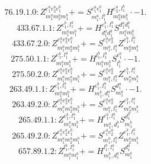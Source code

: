 \documentclass[letterpaper,10pt,fleqn,leqno,onecolumn]{article}
\begin{document}
\begin{equation} \;\;\;\;\;\;  76.19.1.0: Z^{e_{1}^{a}e_{2}^{a}e_{1}^{b}}_{m_{1}^{a}m_{2}^{a}m_{1}^{b}}+=S^{e_{1}^{a}e_{1}^{b}}_{m_{1}^{a},l_{1}^{b}}H^{e_{2}^{a},l_{1}^{b}}_{m_{2}^{a}m_{1}^{b}}\cdot -1. \end{equation}
\begin{equation} \;\;\;\;\;\;  433.67.1.1: Z^{e_{1}^{b},l_{1}^{a}}_{m_{1}^{a}m_{1}^{b}}+=H^{e_{1}^{b},l_{1}^{a}}_{d_{1}^{a}d_{1}^{b}}S^{d_{1}^{a}d_{1}^{b}}_{m_{1}^{a}m_{1}^{b}} \end{equation}
\begin{equation} \;\;\;\;\;\;  433.67.2.0: Z^{e_{1}^{a}e_{2}^{a}e_{1}^{b}}_{m_{1}^{a}m_{2}^{a}m_{1}^{b}}+=S^{e_{1}^{a}e_{2}^{a}}_{m_{1}^{a},l_{1}^{a}}Z^{e_{1}^{b},l_{1}^{a}}_{m_{2}^{a}m_{1}^{b}} \end{equation}
\begin{equation} \;\;\;\;\;\;  275.50.1.1: Z^{e_{1}^{b},l_{1}^{a}}_{m_{1}^{a}m_{1}^{b}}+=H^{l_{1}^{b},l_{1}^{a}}_{m_{1}^{a}m_{1}^{b}}S^{e_{1}^{b}}_{l_{1}^{b}}\cdot -1. \end{equation}
\begin{equation} \;\;\;\;\;\;  275.50.2.0: Z^{e_{1}^{a}e_{2}^{a}e_{1}^{b}}_{m_{1}^{a}m_{2}^{a}m_{1}^{b}}+=S^{e_{1}^{a}e_{2}^{a}}_{m_{1}^{a},l_{1}^{a}}Z^{e_{1}^{b},l_{1}^{a}}_{m_{2}^{a}m_{1}^{b}} \end{equation}
\begin{equation} \;\;\;\;\;\;  263.49.1.1: Z^{e_{1}^{b},l_{1}^{a}}_{m_{1}^{a}m_{1}^{b}}+=H^{e_{1}^{b},l_{1}^{a}}_{m_{1}^{b},d_{1}^{a}}S^{d_{1}^{a}}_{m_{1}^{a}}\cdot -1. \end{equation}
\begin{equation} \;\;\;\;\;\;  263.49.2.0: Z^{e_{1}^{a}e_{2}^{a}e_{1}^{b}}_{m_{1}^{a}m_{2}^{a}m_{1}^{b}}+=S^{e_{1}^{a}e_{2}^{a}}_{m_{1}^{a},l_{1}^{a}}Z^{e_{1}^{b},l_{1}^{a}}_{m_{2}^{a}m_{1}^{b}} \end{equation}
\begin{equation} \;\;\;\;\;\;  265.49.1.1: Z^{e_{1}^{b},l_{1}^{a}}_{m_{1}^{a}m_{1}^{b}}+=H^{e_{1}^{b},l_{1}^{a}}_{m_{1}^{a},d_{1}^{b}}S^{d_{1}^{b}}_{m_{1}^{b}} \end{equation}
\begin{equation} \;\;\;\;\;\;  265.49.2.0: Z^{e_{1}^{a}e_{2}^{a}e_{1}^{b}}_{m_{1}^{a}m_{2}^{a}m_{1}^{b}}+=S^{e_{1}^{a}e_{2}^{a}}_{m_{1}^{a},l_{1}^{a}}Z^{e_{1}^{b},l_{1}^{a}}_{m_{2}^{a}m_{1}^{b}} \end{equation}
\begin{equation} \;\;\;\;\;\;  657.89.1.2: Z^{l_{1}^{b},l_{1}^{a}}_{m_{1}^{a}m_{1}^{b}}+=H^{l_{1}^{b},l_{1}^{a}}_{m_{1}^{b},d_{1}^{a}}S^{d_{1}^{a}}_{m_{1}^{a}} \end{equation}
\end{document}
